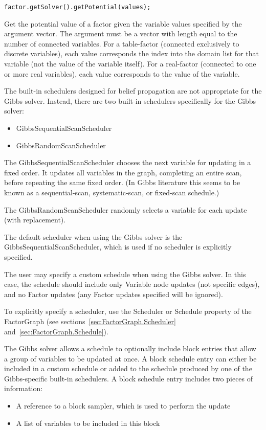 \ifjava
\begin{lstlisting}
factor.getSolver().getPotential(values);
\end{lstlisting}
\fi

Get the potential value of a factor given the variable values specified by the argument vector. The argument must be a vector with length equal to the number of connected variables. For a table-factor (connected exclusively to discrete variables), each value corresponds the index into the domain list for that variable (not the value of the variable itself). For a real-factor (connected to one or more real variables), each value corresponds to the value of the variable.


The built-in schedulers designed for belief propagation are not appropriate for the Gibbs solver.  Instead, there are two built-in schedulers specifically for the Gibbs solver:

\begin{itemize}
\item GibbsSequentialScanScheduler
\item GibbsRandomScanScheduler
\end{itemize}

The GibbsSequentialScanScheduler chooses the next variable for updating in a fixed order. It updates all variables in the graph, completing an entire scan, before repeating the same fixed order. (In Gibbs literature this seems to be known as a sequential-scan, systematic-scan, or fixed-scan schedule.)

The GibbsRandomScanScheduler randomly selects a variable for each update (with replacement).

The default scheduler when using the Gibbs solver is the GibbsSequentialScanScheduler, which is used if no scheduler is explicitly specified.

The user may specify a custom schedule when using the Gibbs solver.  In this case, the schedule should include only Variable node updates (not specific edges), and no Factor updates (any Factor updates specified will be ignored).

To explicitly specify a scheduler, use the Scheduler or Schedule property of the FactorGraph (see sections~\ref{sec:FactorGraph.Scheduler} and~\ref{sec:FactorGraph.Schedule}).

\label{sec:BlockScheduleEntries}

The Gibbs solver allows a schedule to optionally include block entries that allow a group of variables to be updated at once.  A block schedule entry can either be included in a custom schedule or added to the schedule produced by one of the Gibbs-specific built-in schedulers.  A block schedule entry includes two pieces of information:
%
\begin{itemize}
\item A reference to a block sampler, which is used to perform the update
\item A list of variables to be included in this block
\end{itemize}

